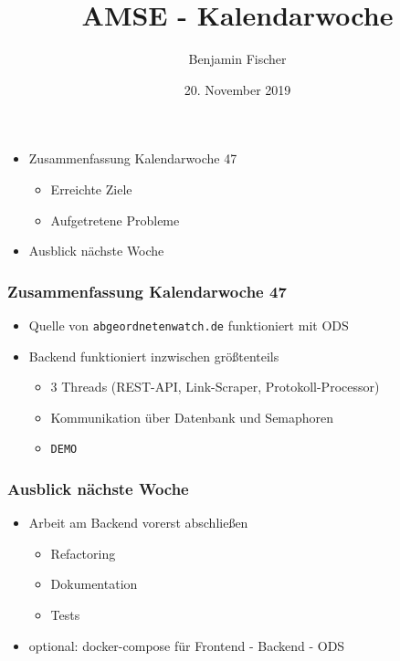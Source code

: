 \documentclass{beamer}
\title{AMSE - Kalendarwoche \cw{}}
\date{20. November 2019}
\author{Benjamin Fischer}
\institute{benjamin.f.fischer@fau.de}
\newcommand{\cw}{47}
\begin{document}
  \maketitle

  \begin{frame}
    \begin{itemize}
      \item Zusammenfassung Kalendarwoche \cw{}
      \begin{itemize}
        \item Erreichte Ziele
        \item Aufgetretene Probleme
      \end{itemize}
      \item Ausblick nächste Woche
    \end{itemize}
  \end{frame}

  \begin{frame}
    \frametitle{Zusammenfassung Kalendarwoche \cw{}}
    \begin{itemize}
      \item Quelle von \texttt{abgeordnetenwatch.de} funktioniert mit ODS
      \item Backend funktioniert inzwischen größtenteils
      \begin{itemize}
        \item 3 Threads (REST-API, Link-Scraper, Protokoll-Processor)
        \item Kommunikation über Datenbank und Semaphoren
        \item \texttt{DEMO}
      \end{itemize}
    \end{itemize}
  \end{frame}

  \begin{frame}
    \frametitle{Ausblick nächste Woche}
    \begin{itemize}
      \item Arbeit am Backend vorerst abschließen
      \begin{itemize}
        \item Refactoring
        \item Dokumentation
        \item Tests
      \end{itemize}
      \item optional: docker-compose für Frontend - Backend - ODS
    \end{itemize}
  \end{frame}
\end{document}
